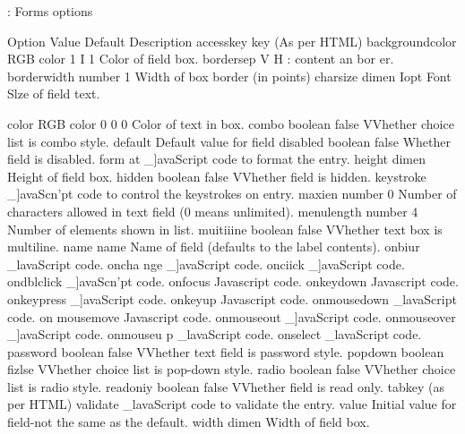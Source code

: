 : Forms options 

Option Value Default Description 
accesskey key (As per HTML) 
backgroundcolor RGB color 1 I 1 Color of field box. 
bordersep V H : content an bor er. 
borderwidth number 1 Width of box border (in points) 
charsize dimen Iopt Font Slze of field text. 
 
color RGB color 0 0 0 Color of text in box. 
combo boolean false VVhether choice list is combo style. 
default Default value for field 
disabled boolean false Whether field is disabled. 
form at _]avaScript code to format the entry. 
height dimen Height of field box. 
hidden boolean false VVhether field is hidden. 
keystroke _]avaScn'pt code to control the keystrokes on entry. 
maxien number 0 Number of characters allowed in text field (0 means 
unlimited). 
menulength number 4 Number of elements shown in list. 
muitiiine boolean false VVhether text box is multiline. 
name name Name of field (defaults to the label contents). 
onbiur _lavaScript code. 
oncha nge _]avaScript code. 
onciick _]avaScript code. 
ondblclick _]avaScn'pt code. 
onfocus Javascript code. 
onkeydown Javascript code. 
onkeypress _]avaScript code. 
onkeyup Javascript code. 
onmousedown _lavaScript code. 
on mousemove Javascript code. 
onmouseout _]avaScript code. 
onmouseover _]avaScript code. 
onmouseu p _lavaScript code. 
onselect _lavaScript code. 
password boolean false VVhether text field is password style. 
popdown boolean fizlse VVhether choice list is pop-down style. 
radio boolean false VVhether choice list is radio style. 
readoniy boolean false VVhether field is read only. 
tabkey (as per HTML) 
validate _lavaScript code to validate the entry. 
value Initial value for field-not the same as the default. 
width dimen Width of field box.
